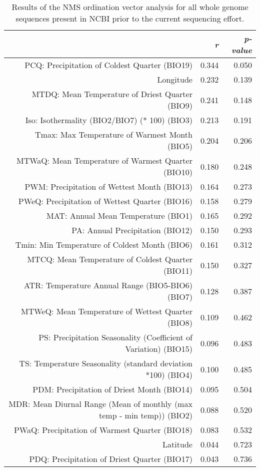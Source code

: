 \begin{table}[ht]
\centering
\begin{tabular}{rrr}
  \hline
 & {\emph{r}} & {\emph{p-value}} \\ 
  \hline
PCQ: Precipitation of Coldest Quarter (BIO19) & 0.344 & 0.050 \\ 
  Longitude & 0.232 & 0.139 \\ 
  MTDQ: Mean Temperature of Driest Quarter (BIO9) & 0.241 & 0.148 \\ 
  Iso: Isothermality (BIO2/BIO7) (* 100) (BIO3) & 0.213 & 0.191 \\ 
  Tmax: Max Temperature of Warmest Month (BIO5) & 0.204 & 0.206 \\ 
  MTWaQ: Mean Temperature of Warmest Quarter (BIO10) & 0.180 & 0.248 \\ 
  PWM: Precipitation of Wettest Month (BIO13) & 0.164 & 0.273 \\ 
  PWeQ: Precipitation of Wettest Quarter (BIO16) & 0.158 & 0.279 \\ 
  MAT: Annual Mean Temperature (BIO1) & 0.165 & 0.292 \\ 
  PA: Annual Precipitation (BIO12) & 0.150 & 0.293 \\ 
  Tmin: Min Temperature of Coldest Month (BIO6) & 0.161 & 0.312 \\ 
  MTCQ: Mean Temperature of Coldest Quarter (BIO11) & 0.150 & 0.327 \\ 
  ATR: Temperature Annual Range (BIO5-BIO6) (BIO7) & 0.128 & 0.387 \\ 
  MTWeQ: Mean Temperature of Wettest Quarter (BIO8) & 0.109 & 0.462 \\ 
  PS: Precipitation Seasonality (Coefficient of Variation) (BIO15) & 0.096 & 0.483 \\ 
  TS: Temperature Seasonality (standard deviation *100) (BIO4) & 0.100 & 0.485 \\ 
  PDM: Precipitation of Driest Month (BIO14) & 0.095 & 0.504 \\ 
  MDR: Mean Diurnal Range (Mean of monthly (max temp - min temp)) (BIO2) & 0.088 & 0.520 \\ 
  PWaQ: Precipitation of Warmest Quarter (BIO18) & 0.083 & 0.532 \\ 
  Latitude & 0.044 & 0.723 \\ 
  PDQ: Precipitation of Driest Quarter (BIO17) & 0.043 & 0.736 \\ 
   \hline
\end{tabular}
\caption{Results of the NMS ordination vector analysis for all whole genome sequences present in NCBI prior to the current sequencing effort.} 
\label{tab:wc_napg_vec}
\end{table}
